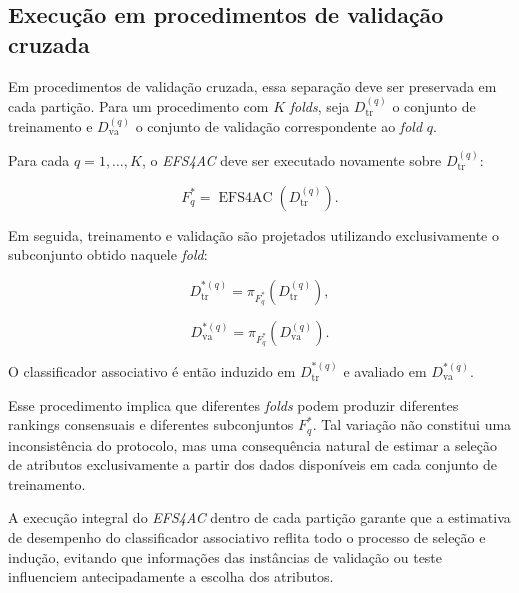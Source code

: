 \subsection{Execução em procedimentos de validação cruzada}
\label{subsec:ac-efs-validacao-cruzada}

Em procedimentos de validação cruzada, essa separação deve ser preservada em
cada partição. Para um procedimento com $K$ \textit{folds}, seja
$D_{\mathrm{tr}}^{(q)}$ o conjunto de treinamento e
$D_{\mathrm{va}}^{(q)}$ o conjunto de validação correspondente ao
\textit{fold} $q$.

Para cada $q=1,\ldots,K$, o \textit{EFS4AC} deve ser executado novamente sobre
$D_{\mathrm{tr}}^{(q)}$:

\begin{equation}
    F_{q}^{*}
    =
    \operatorname{EFS4AC}
    \left(
        D_{\mathrm{tr}}^{(q)}
    \right).
    \label{eq:efs-fold-ac-efs}
\end{equation}

Em seguida, treinamento e validação são projetados utilizando exclusivamente
o subconjunto obtido naquele \textit{fold}:

\begin{equation}
    D_{\mathrm{tr}}^{*(q)}
    =
    \pi_{F_q^{*}}
    \left(
        D_{\mathrm{tr}}^{(q)}
    \right),
\end{equation}

\begin{equation}
    D_{\mathrm{va}}^{*(q)}
    =
    \pi_{F_q^{*}}
    \left(
        D_{\mathrm{va}}^{(q)}
    \right).
\end{equation}

O classificador associativo é então induzido em
$D_{\mathrm{tr}}^{*(q)}$ e avaliado em $D_{\mathrm{va}}^{*(q)}$.

Esse procedimento implica que diferentes \textit{folds} podem produzir
diferentes rankings consensuais e diferentes subconjuntos $F_q^{*}$. Tal
variação não constitui uma inconsistência do protocolo, mas uma consequência
natural de estimar a seleção de atributos exclusivamente a partir dos dados
disponíveis em cada conjunto de treinamento.

A execução integral do \textit{EFS4AC} dentro de cada partição garante que a
estimativa de desempenho do classificador associativo reflita todo o processo
de seleção e indução, evitando que informações das instâncias de validação ou
teste influenciem antecipadamente a escolha dos atributos.
